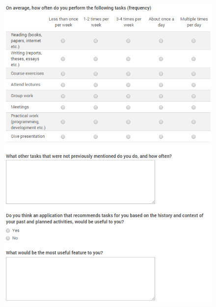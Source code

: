 \begin{figure}[tbp]
\includegraphics[width=\columnwidth]{appendix/StudentTasks2.PNG}
\caption{}
\label{}
\end{figure}